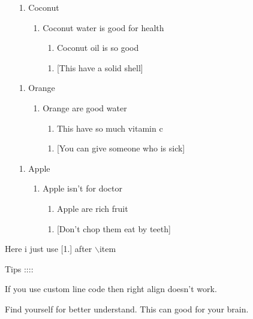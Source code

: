 \documentclass[11pt]{article}
\begin{document}
\pagebreak

\begin{enumerate}
\item [1.] Coconut
\begin{itemize}
\item [1.] Coconut water is good for health
\begin{enumerate}[A.]
\item [1.] Coconut oil is so good
\item [1.] [This have a solid shell]
\end{enumerate}
\end{itemize}
\item [1.] Orange
\begin{itemize}
\item [1.] Orange are good water
\begin{enumerate}[A.]
\item [1.] This have so much vitamin c
\item [1.] [You can give someone who is sick]
\end{enumerate}
\end{itemize}
\item [1.] Apple
\begin{itemize}
\item [1.] Apple isn't for doctor
\begin{enumerate}[A.]
\item [1.] Apple are rich fruit
\item [1.] [Don't chop them eat by teeth]
\end{enumerate}
\end{itemize}
\end{enumerate}


Here i just use [1.] after $\backslash$item

\vspace{1cm}

Tips ::::

If you use custom line code then right align doesn't work.

Find yourself for better understand. This can good for your brain.
\end{document}
